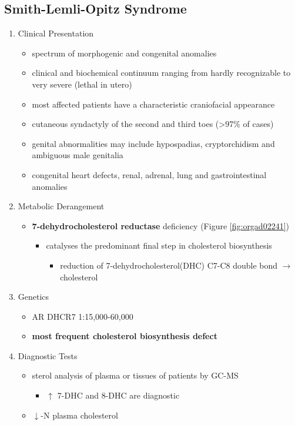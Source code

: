 \documentclass{scrartcl}
\begin{document}
\subsection{Smith-Lemli-Opitz Syndrome}
\label{sec:org0e23a6b}
\begin{enumerate}
\item Clinical Presentation
\label{sec:org08c6ca4}
\begin{itemize}
\item spectrum of morphogenic and congenital anomalies
\item clinical and biochemical continuum ranging from hardly recognizable
to very severe (lethal in utero)
\item most affected patients have a characteristic craniofacial appearance
\item cutaneous syndactyly of the second and third toes (>97\% of cases)
\item genital abnormalities may include hypospadias, cryptorchidism and
ambiguous male genitalia
\item congenital heart defects, renal, adrenal, lung and gastrointestinal
anomalies
\end{itemize}

\item Metabolic Derangement
\label{sec:orgaefcb8d}
\begin{itemize}
\item \textbf{7-dehydrocholesterol reductase} deficiency (Figure \ref{fig:orgad02241})
\begin{itemize}
\item catalyses the predominant final step in cholesterol biosynthesis
\begin{itemize}
\item reduction of 7-dehydrocholesterol(DHC) C7-C8 double bond \(\to\) cholesterol
\end{itemize}
\end{itemize}
\end{itemize}

\item Genetics
\label{sec:orgf585971}
\begin{itemize}
\item AR DHCR7 1:15,000-60,000
\item \textbf{most frequent cholesterol biosynthesis defect}
\end{itemize}

\item Diagnostic Tests
\label{sec:org018af0d}
\begin{itemize}
\item sterol analysis of plasma or tissues of patients by GC-MS
\begin{itemize}
\item \(\uparrow\) 7-DHC and 8-DHC are diagnostic
\end{itemize}
\item \(\downarrow\)-N plasma cholesterol
\end{itemize}


\end{enumerate}
\end{document}
